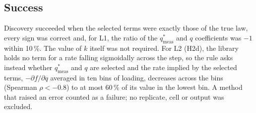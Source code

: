 \documentclass[11pt]{article}
\newcommand{\qsm}{q^{*}_{\mathrm{meas}}}
\begin{document}
\subsection*{Success}
Discovery succeeded when the selected terms were exactly those of the true law, every sign
was correct and, for L1, the ratio of the $\qsm$ and $q$ coefficients was $-1$ within
10\,\%. The value of $k$ itself was not required. For L2 (H2d), the library holds no term for a
rate falling sigmoidally across the step, so the rule asks instead whether $\qsm$ and $q$ are
selected and the rate implied by the selected terms, $-\partial f/\partial q$ averaged in ten bins
of loading, decreases across the bins (Spearman $\rho < -0.8$) to at most 60\,\% of its value in
the lowest bin. A method that raised an error counted as a failure; no replicate, cell or output
was excluded.
\end{document}
